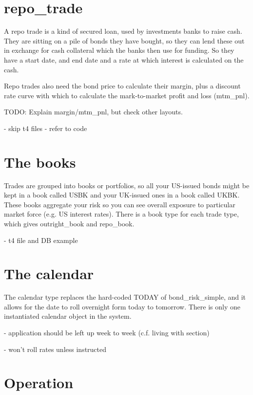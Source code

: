 \documentclass{report}
\begin{document}
\section{repo_trade}

A repo trade is a kind of secured loan, used by investments banks to raise cash. They are sitting on a pile of bonds they have bought, so they can lend these out in exchange for cash collateral which the banks then use for funding. So they have a start date, and end date and a rate at which interest is calculated on the cash.

Repo trades also need the bond price to calculate their margin, plus a discount rate curve with which to 
calculate the mark-to-market profit and loss (mtm_pnl).

TODO: Explain margin/mtm_pnl, but check other layouts.

- skip t4 files - refer to code

\section{The books}

Trades are grouped into books or portfolios, so all your US-issued bonds might be kept in a book called USBK and your UK-issued ones in a book called UKBK. These books aggregate your risk so you can see overall exposure to particular market force (e.g. US interest rates). There is a book type for each trade type, which gives outright_book and repo_book.

- t4 file and DB example

\section{The calendar}

The calendar type replaces the hard-coded TODAY of bond_risk_simple, and it allows for the date to roll overnight form today to tomorrow. There is only one instantiated calendar object in the system.

- application should be left up week to week (c.f. living with section)

- won't roll rates unless instructed













\section{Operation}
\end{document}
